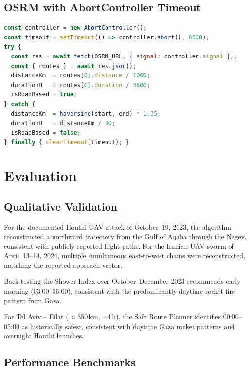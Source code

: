 \documentclass[12pt,a4paper]{article}
\begin{document}
\subsection{OSRM with AbortController Timeout}

\begin{lstlisting}[style=tscode, language=JavaScript,
  caption={OSRM with 6-second timeout and graceful fallback}]
const controller = new AbortController();
const timeout = setTimeout(() => controller.abort(), 6000);
try {
  const res = await fetch(OSRM_URL, { signal: controller.signal });
  const { routes } = await res.json();
  distanceKm  = routes[0].distance / 1000;
  durationH   = routes[0].duration / 3600;
  isRoadBased = true;
} catch {
  distanceKm  = haversine(start, end) * 1.35;
  durationH   = distanceKm / 80;
  isRoadBased = false;
} finally { clearTimeout(timeout); }
\end{lstlisting}

\section{Evaluation}
\label{sec:evaluation}

\subsection{Qualitative Validation}

For the documented Houthi UAV attack of October~19, 2023, the algorithm
reconstructed a northward trajectory from the Gulf of Aqaba through the Negev,
consistent with publicly reported flight paths. For the Iranian UAV swarm of
April~13--14, 2024, multiple simultaneous east-to-west chains were reconstructed,
matching the reported approach vector.

Back-testing the Shower Index over October--December 2023 recommends early
morning (03:00--06:00), consistent with the predominantly daytime rocket fire
pattern from Gaza.

For Tel Aviv -- Eilat ($\approx$350\,km, $\sim$4\,h), the Safe Route Planner
identifies 00:00--05:00 as historically safest, consistent with daytime Gaza
rocket patterns and overnight Houthi launches.

\subsection{Performance Benchmarks}
\end{document}

